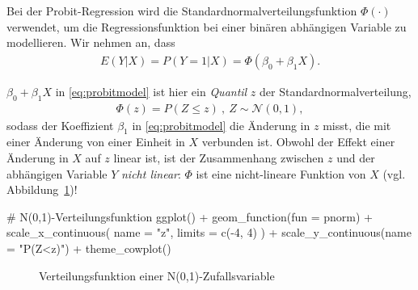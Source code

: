 \documentclass[
  a4paper,
  DIV=11,
  oneside]{scrreprt}
\newenvironment{Shaded}{\begin{snugshade}}{\end{snugshade}}
\newcommand{\AttributeTok}[1]{\textcolor[rgb]{0.40,0.45,0.13}{#1}}
\newcommand{\CommentTok}[1]{\textcolor[rgb]{0.37,0.37,0.37}{#1}}
\newcommand{\DecValTok}[1]{\textcolor[rgb]{0.68,0.00,0.00}{#1}}
\newcommand{\FunctionTok}[1]{\textcolor[rgb]{0.28,0.35,0.67}{#1}}
\newcommand{\NormalTok}[1]{\textcolor[rgb]{0.00,0.23,0.31}{#1}}
\newcommand{\SpecialCharTok}[1]{\textcolor[rgb]{0.37,0.37,0.37}{#1}}
\newcommand{\StringTok}[1]{\textcolor[rgb]{0.13,0.47,0.30}{#1}}
\begin{document}
Bei der Probit-Regression wird die Standardnormalverteilungsfunktion
\(\Phi(\cdot)\) verwendet, um die Regressionsfunktion bei einer binären
abhängigen Variable zu modellieren. Wir nehmen an, dass \begin{align}
  E(Y\vert X) = P(Y=1\vert X) = \Phi(\beta_0 + \beta_1 X). \label{eq:probitmodel}
\end{align}

\(\beta_0 + \beta_1 X\) in \eqref{eq:probitmodel} ist hier ein
\emph{Quantil} \(z\) der Standardnormalverteilung, \begin{align}
\Phi(z) = P(Z \leq z) \ , \ Z \sim \mathcal{N}(0,1),
\end{align} sodass der Koeffizient \(\beta_1\) in \eqref{eq:probitmodel}
die Änderung in \(z\) misst, die mit einer Änderung von einer Einheit in
\(X\) verbunden ist. Obwohl der Effekt einer Änderung in \(X\) auf \(z\)
linear ist, ist der Zusammenhang zwischen \(z\) und der abhängigen
Variable \(Y\) \emph{nicht linear}: \(\Phi\) ist eine nicht-lineare
Funktion von \(X\) (vgl. Abbildung~\ref{fig-snvf})!

\begin{Shaded}
\begin{Highlighting}[]
\CommentTok{\# N(0,1){-}Verteilungsfunktion}
\FunctionTok{ggplot}\NormalTok{() }\SpecialCharTok{+}
  \FunctionTok{geom\_function}\NormalTok{(}\AttributeTok{fun =}\NormalTok{ pnorm) }\SpecialCharTok{+}
  \FunctionTok{scale\_x\_continuous}\NormalTok{(}
    \AttributeTok{name =} \StringTok{"z"}\NormalTok{, }
    \AttributeTok{limits =} \FunctionTok{c}\NormalTok{(}\SpecialCharTok{{-}}\DecValTok{4}\NormalTok{, }\DecValTok{4}\NormalTok{)}
\NormalTok{  ) }\SpecialCharTok{+}
  \FunctionTok{scale\_y\_continuous}\NormalTok{(}\AttributeTok{name =} \StringTok{"P(Z\textless{}z)"}\NormalTok{) }\SpecialCharTok{+}
  \FunctionTok{theme\_cowplot}\NormalTok{()}
\end{Highlighting}
\end{Shaded}

\begin{figure}[t]


\caption{\label{fig-snvf}Verteilungsfunktion einer
N(0,1)-Zufallsvariable}

\end{figure}%
\end{document}
